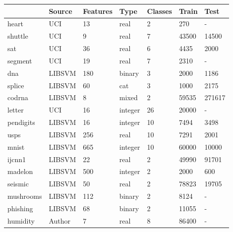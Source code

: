 \begin{tabular}{|l|llllll|}
	\hline
	& Source & Features & Type & Classes & Train & Test \\\hline
	heart & UCI & 13 & real & 2 & 270 & - \\
	shuttle & UCI & 9 & real & 7 & 43500 & 14500 \\
	sat & UCI & 36 & real & 6 & 4435 & 2000 \\
	segment & UCI & 19 & real & 7 & 2310 & - \\
	dna & LIBSVM & 180 & binary & 3 & 2000 & 1186 \\
	splice & LIBSVM & 60 & cat & 3 & 1000 & 2175 \\
	codrna & LIBSVM & 8 & mixed & 2 & 59535 & 271617 \\
	letter & UCI & 16 & integer & 26 & 20000 & - \\
	pendigits & LIBSVM & 16 & integer & 10 & 7494 & 3498 \\
	usps & LIBSVM & 256 & real & 10 & 7291 & 2001 \\
	mnist & LIBSVM & 665 & integer & 10 & 60000 & 10000 \\
	ijcnn1 & LIBSVM & 22 & real & 2 & 49990 & 91701 \\
	madelon & LIBSVM & 500 & integer & 2 & 2000 & 600 \\
	seismic & LIBSVM & 50 & real & 2 & 78823 & 19705 \\
	mushrooms & LIBSVM & 112 & binary & 2 & 8124 & - \\
	phishing & LIBSVM & 68 & binary & 2 & 11055 & - \\
	humidity & Author & 7 & real & 8 & 86400 & - \\
	\hline
\end{tabular}

